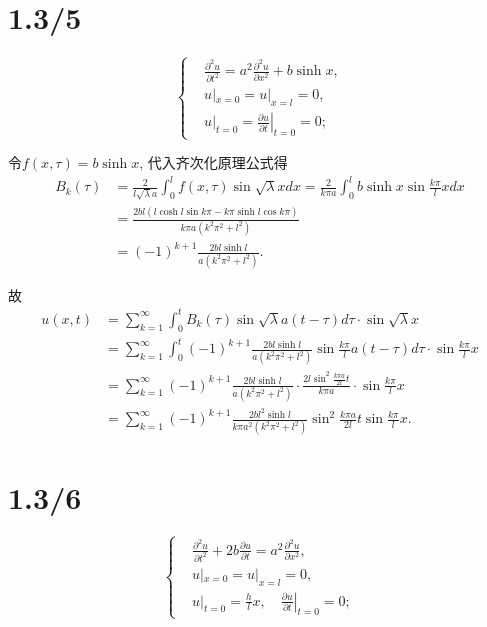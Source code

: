 \documentclass[11pt,a4paper]{article}
\begin{document}
\section{1.3/5}

$$
  \left\{\begin{aligned}
     & \frac{\partial^2u}{\partial t^2}=
    a^2\frac{\partial^2u}{\partial x^2}+b\sinh x,                   \\
     & u|_{x=0}=u|_{x=l}=0,                                         \\
     & u|_{t=0}=\left.\frac{\partial u}{\partial t}\right|_{t=0}=0;
  \end{aligned}\right.
$$

令$f(x,\tau)=b\sinh x$, 代入齐次化原理公式得
\begin{align*}
  B_k(\tau)
   & =\frac{2}{l\sqrt{\lambda}a}\int_0^lf(x,\tau)\sin\sqrt{\lambda}xdx
  =\frac{2}{k\pi a}\int_0^lb\sinh x\sin\frac{k\pi}{l}xdx                       \\
   & =\frac{2bl(l\cosh l\sin k\pi-k\pi\sinh l\cos k\pi)}{k\pi a(k^2\pi^2+l^2)} \\
   & =(-1)^{k+1}\frac{2bl\sinh l}{a(k^2\pi^2+l^2)}.
\end{align*}

故
\begin{align*}
  u(x,t) & =\sum_{k=1}^\infty\int_0^t B_k(\tau)\sin\sqrt{\lambda}a(t-\tau)d\tau\cdot\sin\sqrt{\lambda}x                                          \\
         & =\sum_{k=1}^\infty\int_0^t (-1)^{k+1}\frac{2bl\sinh l}{a(k^2\pi^2+l^2)}\sin\frac{k\pi}{l}a(t-\tau)d\tau\cdot\sin\frac{k\pi}{l}x       \\
         & =\sum_{k=1}^\infty (-1)^{k+1}\frac{2bl\sinh l}{a(k^2\pi^2+l^2)}\cdot\frac{2l\sin^2\frac{k\pi a}{2l}t}{k\pi a}\cdot\sin\frac{k\pi}{l}x \\
         & =\sum_{k=1}^\infty (-1)^{k+1}\frac{2bl^2\sinh l}{k\pi a^2(k^2\pi^2+l^2)}\sin^2\frac{k\pi a}{2l}t\sin\frac{k\pi}{l}x.
\end{align*}

\section{1.3/6}

$$
  \left\{\begin{aligned}
     & \frac{\partial^2u}{\partial t^2}+2b\frac{\partial u}{\partial t}=
    a^2\frac{\partial^2u}{\partial x^2},                                 \\
     & u|_{x=0}=u|_{x=l}=0,                                              \\
     & u|_{t=0}=\frac{h}{l}x,
    \quad \left.\frac{\partial u}{\partial t}\right|_{t=0}=0;
  \end{aligned}\right.
$$
\end{document}
